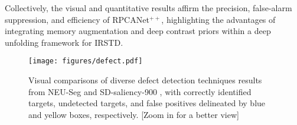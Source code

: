 \documentclass[10pt,journal,compsoc]{IEEEtran}
\begin{document}
\noindent Collectively, the visual and quantitative results affirm the precision, false-alarm suppression, and efficiency of RPCANet$^{++}$, highlighting the advantages of integrating memory augmentation and deep contrast priors within a deep unfolding framework for IRSTD.

\begin{figure*}[t]
\setlength{\abovecaptionskip}{1pt} 
\setlength{\belowcaptionskip}{0pt} 
    \centering
    \texttt{[image: figures/defect.pdf]}
    \caption{Visual comparisons of diverse defect detection techniques results from NEU-Seg \cite{dong-2019-neuseg} and SD-saliency-900 \cite{song-2020-edrnet},  with correctly identified targets, undetected targets, and false positives delineated by \textcolor{blue!70}{blue} and \textcolor{orange!50}{yellow} boxes, respectively. [Zoom in for a better view]}
    \label{fig:defect}
\vspace{-0.2cm}
\end{figure*}
\end{document}
